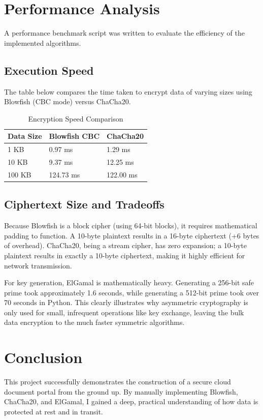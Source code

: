 \documentclass[12pt,a4paper]{article}
\begin{document}
\section{Performance Analysis}
A performance benchmark script was written to evaluate the efficiency of the implemented algorithms.

\subsection{Execution Speed}
The table below compares the time taken to encrypt data of varying sizes using Blowfish (CBC mode) versus ChaCha20.

\begin{table}[h]
\centering
\begin{tabular}{|l|l|l|}
\hline
\textbf{Data Size} & \textbf{Blowfish CBC} & \textbf{ChaCha20} \\ \hline
1 KB & 0.97 ms & 1.29 ms \\ \hline
10 KB & 9.37 ms & 12.25 ms \\ \hline
100 KB & 124.73 ms & 122.00 ms \\ \hline
\end{tabular}
\caption{Encryption Speed Comparison}
\end{table}

\subsection{Ciphertext Size and Tradeoffs}
Because Blowfish is a block cipher (using 64-bit blocks), it requires mathematical padding to function. A 10-byte plaintext results in a 16-byte ciphertext (+6 bytes of overhead). ChaCha20, being a stream cipher, has zero expansion; a 10-byte plaintext results in exactly a 10-byte ciphertext, making it highly efficient for network transmission. 

For key generation, ElGamal is mathematically heavy. Generating a 256-bit safe prime took approximately 1.6 seconds, while generating a 512-bit prime took over 70 seconds in Python. This clearly illustrates why asymmetric cryptography is only used for small, infrequent operations like key exchange, leaving the bulk data encryption to the much faster symmetric algorithms.

\section{Conclusion}
This project successfully demonstrates the construction of a secure cloud document portal from the ground up. By manually implementing Blowfish, ChaCha20, and ElGamal, I gained a deep, practical understanding of how data is protected at rest and in transit. 
\end{document}
